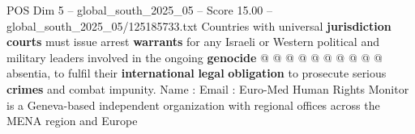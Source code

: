 \begin{textsample}{POS Dim 5 – global\_south\_2025\_05 – Score 15.00 – global\_south\_2025\_05/125185733.txt}
Countries with universal \textbf{jurisdiction} \textbf{courts} must issue arrest \textbf{warrants} for any Israeli or Western political and military leaders involved in the ongoing \textbf{genocide} @ @ @ @ @ @ @ @ @ @ absentia, to fulfil their \textbf{international} \textbf{legal} \textbf{obligation} to prosecute serious \textbf{crimes} and combat impunity.
Name : Email : Euro-Med Human Rights Monitor is a Geneva-based independent organization with regional offices across the MENA region and Europe

\end{textsample}
